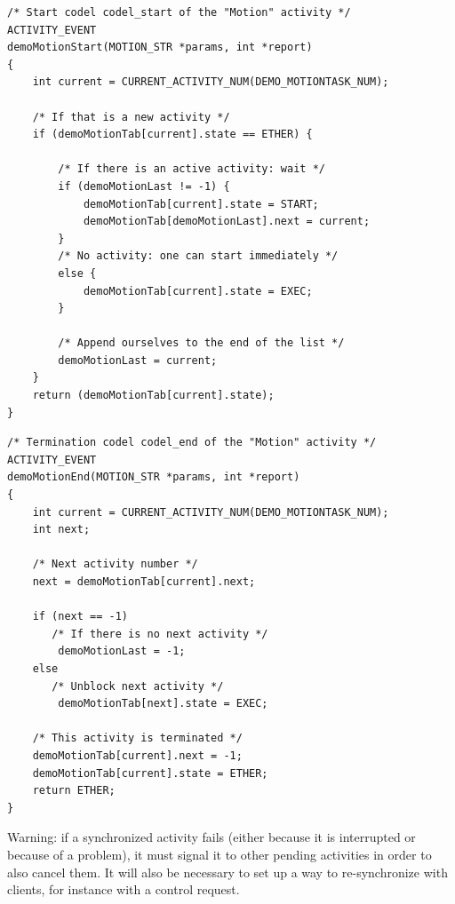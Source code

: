 \begin{center}\begin{cartouche}\small\begin{verbatim}
/* Start codel codel_start of the "Motion" activity */
ACTIVITY_EVENT
demoMotionStart(MOTION_STR *params, int *report)
{
    int current = CURRENT_ACTIVITY_NUM(DEMO_MOTIONTASK_NUM);

    /* If that is a new activity */
    if (demoMotionTab[current].state == ETHER) {

        /* If there is an active activity: wait */
        if (demoMotionLast != -1) {
            demoMotionTab[current].state = START;
            demoMotionTab[demoMotionLast].next = current;
        }
        /* No activity: one can start immediately */
        else {
            demoMotionTab[current].state = EXEC;
        }

        /* Append ourselves to the end of the list */
        demoMotionLast = current;
    }
    return (demoMotionTab[current].state);
}
\end{verbatim}\end{cartouche}\end{center}

\begin{center}\begin{cartouche}\small\begin{verbatim}
/* Termination codel codel_end of the "Motion" activity */
ACTIVITY_EVENT
demoMotionEnd(MOTION_STR *params, int *report)
{
    int current = CURRENT_ACTIVITY_NUM(DEMO_MOTIONTASK_NUM);
    int next;

    /* Next activity number */
    next = demoMotionTab[current].next;

    if (next == -1) 
       /* If there is no next activity */
        demoMotionLast = -1;
    else
       /* Unblock next activity */
        demoMotionTab[next].state = EXEC;

    /* This activity is terminated */
    demoMotionTab[current].next = -1;
    demoMotionTab[current].state = ETHER;
    return ETHER;
}
\end{verbatim}\end{cartouche}\end{center}

Warning: if   a   synchronized activity   fails (either  because   it  is
interrupted or because of a problem), it must signal  it to other pending
activities in order to also cancel them. It will also be necessary to set
up  a way to  re-synchronize  with clients,  for  instance with a control
request.


